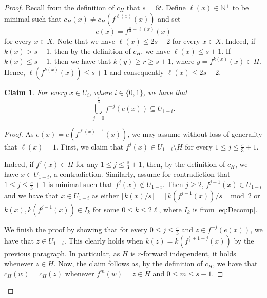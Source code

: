 \documentclass[10pt,a4paper]{amsart}
\newtheorem{claim}{Claim}
\newcommand{\N}{\mathbb N}
\begin{document}
    \begin{proof}
        Recall from the definition of $c_H$ that $s=6t$.
        Define $\ell(x)\in \N^+$ to be minimal such that $c_H(x)\not=c_H(f^{\ell(x)}(x))$ and set
        $$e(x)=f^{\frac{s}{3}+\ell(x)}(x)$$
        for every $x\in X$.
        Note that we have $\ell(x)\le 2s+2$ for every $x\in X$.
        Indeed, if $k(x) > s + 1$, then by the definition of $c_{H}$, we have $\ell(x) \leq s + 1$.
        If $k(x) \leq s + 1$, then we have that $k(y) \ge r \geq s + 1$, where $y=f^{k(x)}(x)\in H$.        
        Hence, $\ell(f^{k(x)}(x)) \leq s + 1$ and consequently $\ell(x) \leq 2s + 2$.
        
        \begin{claim}\label{cl:BasicThree}
            For every $x\in U_i$, where $i\in \{0,1\}$, we have that
            $$\bigcup_{j=0}^{\frac{s}{3}} f^{-j}(e(x))\subseteq U_{1-i}.$$
        \end{claim}
        \begin{proof}
            As $e(x)=e(f^{\ell(x)-1}(x))$, we may assume without loss of generality that $\ell(x)=1$.
            First, we claim that $f^j(x)\in U_{1-i}\setminus H$ for every $1\le j\le \frac{s}{3}+1$.

            Indeed, if $f^j(x)\in H$ for any $1\le j\le \frac{s}{3}+1$, then, by the definition of $c_H$, we have $x\in U_{1-i}$, a contradiction.
            Similarly, assume for contradiction that $1\le j\le \frac{s}{3}+1$ is minimal such that $f^j(x)\not\in U_{1-i}$.
            Then $j\ge 2$, $f^{j-1}(x)\in U_{1-i}$ and we have that $x\in U_{1-i}$ as either $\lfloor k(x)/s \rfloor=\lfloor k(f^{j-1}(x))/s \rfloor \mod 2$ or $k(x),k(f^{j-1}(x))\in I_k$ for some $0\le k\le 2\ell$, where $I_k$ is from \eqref{eq:Decomp}.
            
            \medskip

            We finish the proof by showing that for every $0\le j\le \frac{s}{3}$ and $z\in f^{-j}(e(x))$, we have that $z\in U_{1-i}$.
            This clearly holds when $k(z)=k(f^{\frac{s}{3}+1-j}(x))$ by the previous paragraph.
            In particular, as $H$ is $r$-forward independent, it holds whenever $z\in H$.
            Now, the claim follows as, by the definition of $c_H$, we have that $c_H(w)=c_{H}(z)$ whenever $f^m(w)=z\in H$ and $0\le m\le s-1$.           
        \end{proof}
        

\end{proof}
\end{document}
